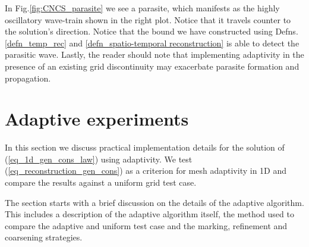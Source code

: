 \documentclass[final]{amsart}
\numberwithin{equation}{section}
\begin{document}

In Fig.\ref{fig:CNCS_parasite} we see a parasite, which manifests as the highly oscillatory wave-train shown in the right plot.  Notice that it travels counter to the solution's direction.        Notice that the bound we have constructed using  Defns. \ref{defn_temp_rec} and \ref{defn_spatio-temporal reconstruction} is able to detect the parasitic wave.  Lastly, the reader should note that implementing adaptivity in the presence of an existing grid discontinuity may exacerbate parasite formation and propagation.


\section{Adaptive experiments}\label{sec:adaptive_implementation}
In  this section we discuss practical implementation details for the solution of (\ref{eq_1d_gen_cons_law}) using adaptivity.   We test (\ref{eq_reconstruction_gen_cons}) as a criterion for mesh adaptivity in 1D and  compare the results against a uniform grid test case. 

The section starts with a brief discussion on the details of the adaptive algorithm.  This includes a description of the adaptive algorithm itself,  the method used  to compare the adaptive and uniform test case and the  marking,  refinement and coarsening strategies.
\end{document}
